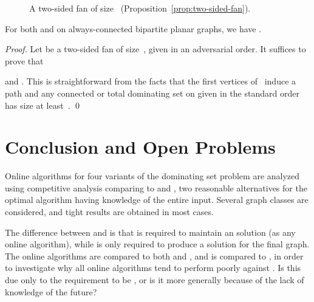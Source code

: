 \begin{figure}[!htb]
\begin{center}
\caption{A two-sided fan of size~ (Proposition~\ref{prop:two-sided-fan}).
\label{fig:rotor}}
\end{center}
\end{figure}

\begin{proposition}
\label{prop:two-sided-fan}
For both \cds and \tds
on always-connected bipartite planar graphs, we have
.
\end{proposition}
\begin{proof}
Let  be a two-sided fan of size~, given in an adversarial order.
It suffices to prove that

and .
This is straightforward from the facts that the first  vertices of~
induce a path and any \incr connected or total dominating set on
 given in the standard order has size at least~.
\qed\end{proof}


\section{Conclusion and Open Problems}
Online algorithms for four variants of the dominating set problem
are analyzed using competitive analysis comparing to \onopt{} and \offopt{},
two reasonable alternatives for the optimal algorithm having
knowledge of the entire input.
Several graph classes are considered, and tight results are 
obtained in most cases.

The difference between \onopt and \offopt is that \onopt is
required to maintain an \incr solution (as any online algorithm),
while \offopt is only
required to produce a solution for the final graph.
The online algorithms are compared to both \onopt and \offopt,
and \onopt is compared to \offopt, in order to investigate
why all online algorithms tend to perform poorly against \offopt. 
Is this due only to the requirement to be \incr,
or is it more generally because of the lack of knowledge of the future?

